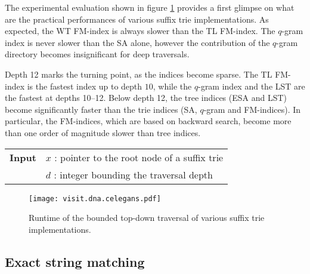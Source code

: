 The experimental evaluation shown in figure \ref{fig:visit-dna} provides a first glimpse on what are the practical performances of various suffix trie implementations.
As expected, the WT FM-index is always slower than the TL FM-index.
The $q$-gram index is never slower than the SA alone, however the contribution of the $q$-gram directory becomes insignificant for deep traversals.

Depth 12 marks the turning point, as the indices become sparse.
The TL FM-index is the fastest index up to depth $10$, while the $q$-gram index and the LST are the fastest at depths 10--12.
Below depth 12, the tree indices (ESA and LST) become significantly faster than the trie indices (SA, $q$-gram and FM-indices).
In particular, the FM-indices, which are based on backward search, become more than one order of magnitude slower than tree indices.

\begin{figure*}[t]
\begin{center}
\begin{minipage}[t]{.7\textwidth}
\begin{algorithm}[H]
\begin{tabular}{ll}
\textbf{Input}  & $x$ : pointer to the root node of a suffix trie\\
 			    & $d$ : integer bounding the traversal depth\\
\end{tabular}
\begin{algorithmic}[1]
		\Repeat
			\State {}
		\Until {}
	\EndIf
\EndIf
\end{algorithmic}
\label{alg:st-dfs}
\end{algorithm}
\end{minipage}
\end{center}
\end{figure*}

\begin{figure}[b]
\begin{center}
\caption[Top-down traversal runtime]{Runtime of the bounded top-down traversal of various suffix trie implementations.}
\label{fig:visit-dna}
\texttt{[image: visit.dna.celegans.pdf]}
\end{center}
\end{figure}

\subsection{Exact string matching}
\label{sec:index:algo:exact}

